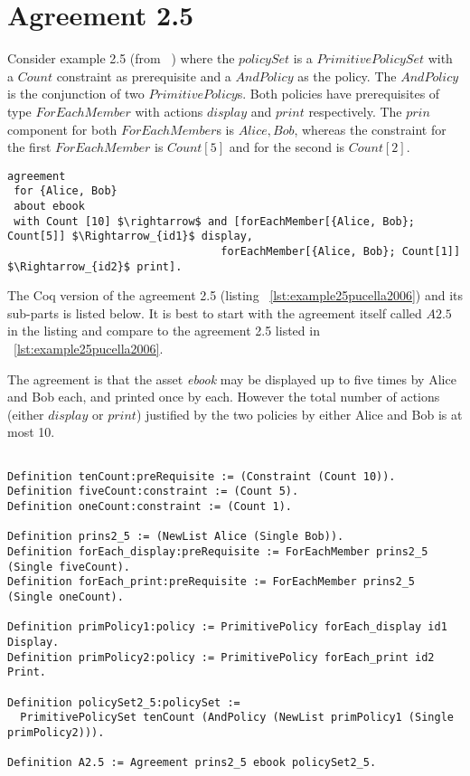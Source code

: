 \section{Agreement 2.5}

Consider example 2.5 (from ~\cite{pucella2006}) where the $policySet$ is a $PrimitivePolicySet$ with a $Count$ constraint as prerequisite and a $AndPolicy$ as the policy. The $AndPolicy$ is the conjunction of two $PrimitivePolicy$s. Both policies have prerequisites of type $ForEachMember$ with actions $display$ and $print$ respectively. The $prin$ component for both $ForEachMember$s is ${Alice, Bob}$, whereas the constraint for the first $ForEachMember$ is $Count[5]$ and for the second is $Count[2]$.

\lstset{language=Pucella2006}
\begin{lstlisting}[frame=single, caption={Agreement 2.5 (as used in ~\cite{pucella2006})},label={lst:example25pucella2006}]
agreement
 for {Alice, Bob} 
 about ebook 
 with Count [10] $\rightarrow$ and [forEachMember[{Alice, Bob}; Count[5]] $\Rightarrow_{id1}$ display,
                                 forEachMember[{Alice, Bob}; Count[1]] $\Rightarrow_{id2}$ print].
\end{lstlisting}

The Coq version of the agreement 2.5 (listing ~\ref{lst:example25pucella2006}) and its sub-parts is listed below. It is best to start with the agreement itself called $A2.5$ in the listing and compare to the agreement 2.5 listed in ~\ref{lst:example25pucella2006}.

The agreement is that the asset \emph{ebook} may be displayed up to five times by Alice and Bob each, and printed once by each. However the total number of actions (either $display$ or $print$) justified by the two policies by either Alice and Bob is at most 10.


\lstset{language=Coq}
\begin{lstlisting}[frame=single, caption={Example 2.5},label={lst:example25}]

Definition tenCount:preRequisite := (Constraint (Count 10)).
Definition fiveCount:constraint := (Count 5).
Definition oneCount:constraint := (Count 1).

Definition prins2_5 := (NewList Alice (Single Bob)).
Definition forEach_display:preRequisite := ForEachMember prins2_5 (Single fiveCount).
Definition forEach_print:preRequisite := ForEachMember prins2_5 (Single oneCount).

Definition primPolicy1:policy := PrimitivePolicy forEach_display id1 Display.
Definition primPolicy2:policy := PrimitivePolicy forEach_print id2 Print.

Definition policySet2_5:policySet :=
  PrimitivePolicySet tenCount (AndPolicy (NewList primPolicy1 (Single primPolicy2))).
                     
Definition A2.5 := Agreement prins2_5 ebook policySet2_5.

\end{lstlisting}

